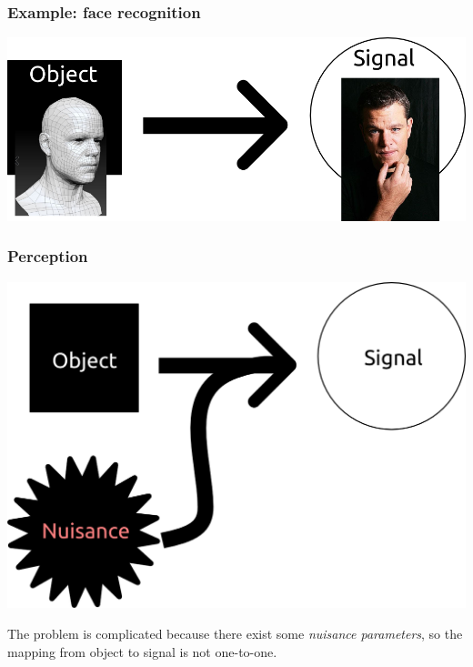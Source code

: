 \documentclass{beamer}
\begin{document}
\begin{frame}
\frametitle{Example: face recognition}
\begin{center}
\includegraphics[scale = 0.4]{defense_diagrams/face_1.png}
\end{center}
\end{frame}

\begin{frame}
\frametitle{Perception}
\begin{center}
\includegraphics[scale = 0.2]{defense_diagrams/object_signal_nuisance.png}
\end{center}
The problem is complicated because there exist some \emph{nuisance parameters}, so the mapping from object to signal is not one-to-one.
\end{frame}
\end{document}
